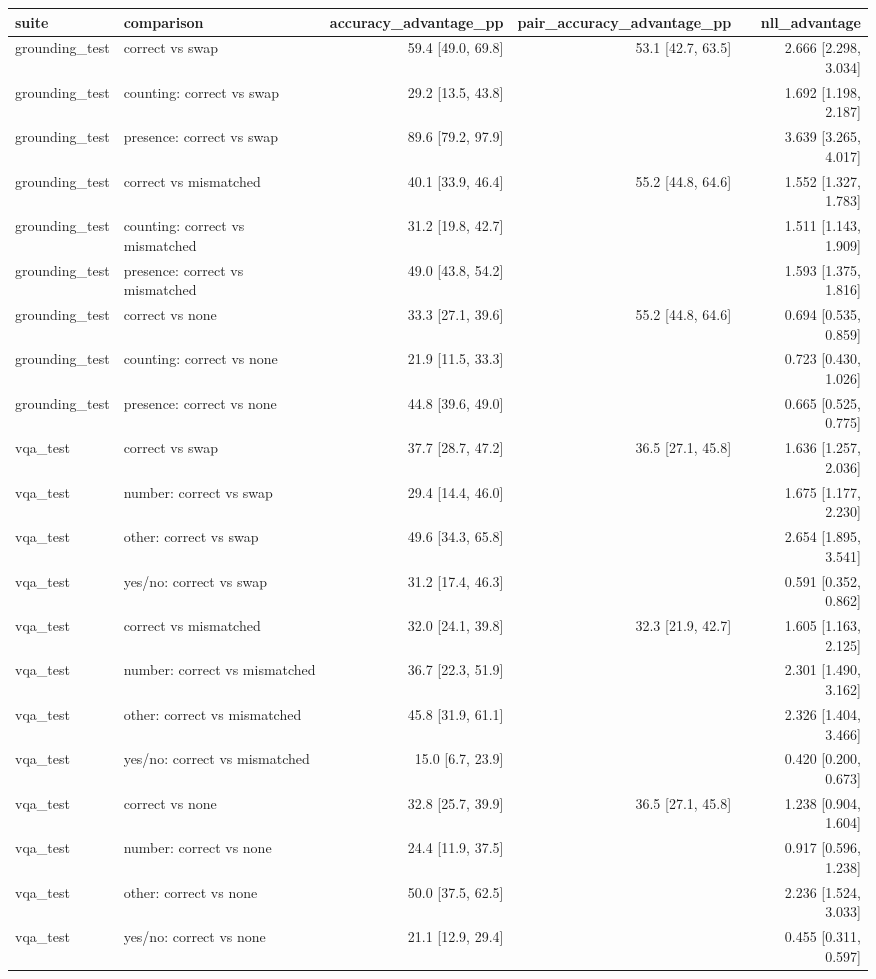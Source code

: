 \begin{tabular}{llrrr}
\toprule
suite & comparison & accuracy\_advantage\_pp & pair\_accuracy\_advantage\_pp & nll\_advantage \\
\midrule
grounding\_test & correct vs swap & 59.4 [49.0, 69.8] & 53.1 [42.7, 63.5] & 2.666 [2.298, 3.034] \\
grounding\_test &   counting: correct vs swap & 29.2 [13.5, 43.8] &  & 1.692 [1.198, 2.187] \\
grounding\_test &   presence: correct vs swap & 89.6 [79.2, 97.9] &  & 3.639 [3.265, 4.017] \\
grounding\_test & correct vs mismatched & 40.1 [33.9, 46.4] & 55.2 [44.8, 64.6] & 1.552 [1.327, 1.783] \\
grounding\_test &   counting: correct vs mismatched & 31.2 [19.8, 42.7] &  & 1.511 [1.143, 1.909] \\
grounding\_test &   presence: correct vs mismatched & 49.0 [43.8, 54.2] &  & 1.593 [1.375, 1.816] \\
grounding\_test & correct vs none & 33.3 [27.1, 39.6] & 55.2 [44.8, 64.6] & 0.694 [0.535, 0.859] \\
grounding\_test &   counting: correct vs none & 21.9 [11.5, 33.3] &  & 0.723 [0.430, 1.026] \\
grounding\_test &   presence: correct vs none & 44.8 [39.6, 49.0] &  & 0.665 [0.525, 0.775] \\
vqa\_test & correct vs swap & 37.7 [28.7, 47.2] & 36.5 [27.1, 45.8] & 1.636 [1.257, 2.036] \\
vqa\_test &   number: correct vs swap & 29.4 [14.4, 46.0] &  & 1.675 [1.177, 2.230] \\
vqa\_test &   other: correct vs swap & 49.6 [34.3, 65.8] &  & 2.654 [1.895, 3.541] \\
vqa\_test &   yes/no: correct vs swap & 31.2 [17.4, 46.3] &  & 0.591 [0.352, 0.862] \\
vqa\_test & correct vs mismatched & 32.0 [24.1, 39.8] & 32.3 [21.9, 42.7] & 1.605 [1.163, 2.125] \\
vqa\_test &   number: correct vs mismatched & 36.7 [22.3, 51.9] &  & 2.301 [1.490, 3.162] \\
vqa\_test &   other: correct vs mismatched & 45.8 [31.9, 61.1] &  & 2.326 [1.404, 3.466] \\
vqa\_test &   yes/no: correct vs mismatched & 15.0 [6.7, 23.9] &  & 0.420 [0.200, 0.673] \\
vqa\_test & correct vs none & 32.8 [25.7, 39.9] & 36.5 [27.1, 45.8] & 1.238 [0.904, 1.604] \\
vqa\_test &   number: correct vs none & 24.4 [11.9, 37.5] &  & 0.917 [0.596, 1.238] \\
vqa\_test &   other: correct vs none & 50.0 [37.5, 62.5] &  & 2.236 [1.524, 3.033] \\
vqa\_test &   yes/no: correct vs none & 21.1 [12.9, 29.4] &  & 0.455 [0.311, 0.597] \\
\bottomrule
\end{tabular}

